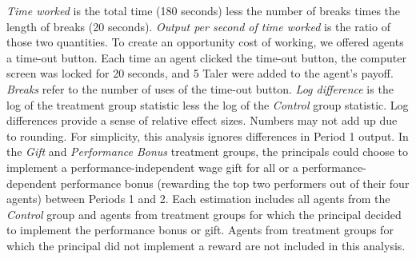 \begin{landscape}
\begin{table}[h]
\begin{center}
\begin{minipage}{1.2\textwidth}
\textit{Time worked} is the total time (180 seconds) less the number of breaks times the length of breaks (20 seconds). 
\textit{Output per second of time worked} is the ratio of those two quantities. 
To create an opportunity cost of working, we offered agents a time-out button. Each time an agent clicked the time-out button, the computer screen was locked for 20 seconds, and 5 Taler were added to the agent's payoff. \textit{Breaks} refer to the number of uses of the time-out button. 
\textit{Log difference} is the log of the treatment group statistic less the log of the \textit{Control} group statistic. Log differences provide a sense of relative effect sizes. 
Numbers may not add up due to rounding. 
For simplicity, this analysis ignores differences in Period 1 output. 
In the \textit{Gift} and \textit{Performance Bonus} treatment groups, the principals could choose to implement a performance-independent wage gift for all or a performance-dependent performance bonus (rewarding the top two performers out of their four agents) between Periods 1 and 2. 
Each estimation includes all agents from the \textit{Control} group and agents from treatment groups for which the principal decided to implement the performance bonus or gift. Agents from treatment groups for which the principal did not implement a reward are not included in this analysis. 
\end{minipage}
\end{center}
\end{table}
\end{landscape}